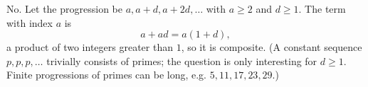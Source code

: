 No. Let the progression be $a,a+d,a+2d,\dots$ with $a\ge2$ and $d\ge1$. The term with index $a$ is
\[
a+ad=a(1+d),
\]
a product of two integers greater than $1$, so it is composite. (A constant sequence $p,p,p,\dots$ trivially consists of primes; the question is only interesting for $d\ge1$. Finite progressions of primes can be long, e.g. $5,11,17,23,29$.)
